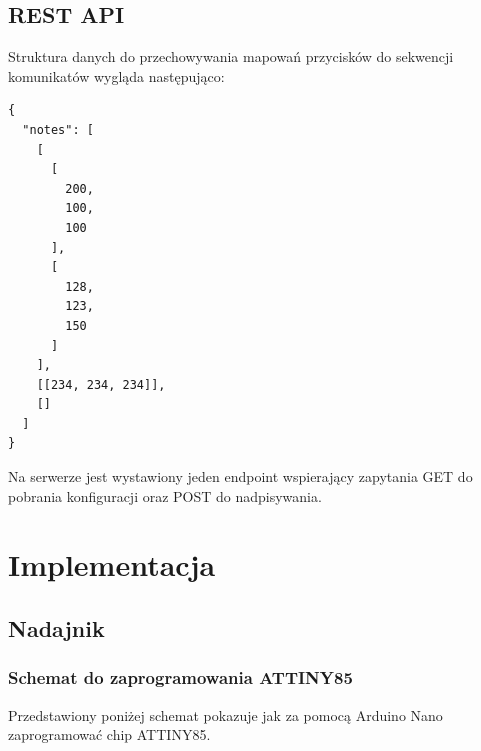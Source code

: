 \documentclass[eng,printmode]{mgr}
\begin{document}
\section{REST API}

Struktura danych do przechowywania mapowań przycisków do sekwencji komunikatów wygląda następująco:

\begin{lstlisting}
{
  "notes": [
    [
      [
        200,
        100,
        100
      ],
      [
        128,
        123,
        150
      ]
    ],
    [[234, 234, 234]],
    []
  ]
}
\end{lstlisting}

Na serwerze jest wystawiony jeden endpoint wspierający zapytania GET do pobrania konfiguracji oraz POST do nadpisywania.

\chapter{Implementacja}
\section{Nadajnik}
\subsection{Schemat do zaprogramowania ATTINY85}

Przedstawiony poniżej schemat pokazuje jak za pomocą Arduino Nano zaprogramować chip ATTINY85.
\end{document}
